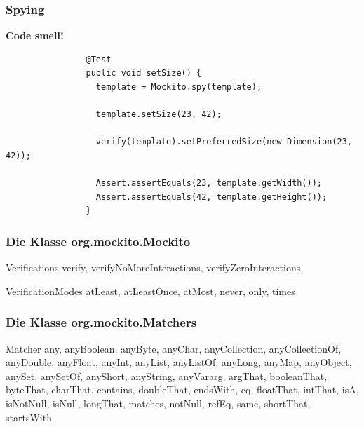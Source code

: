 \documentclass{beamer}
\begin{document}
			\begin{frame}[fragile]
				\frametitle{Spying}
				\color{red}\textbf{Code smell!}
				\color{black}
				\begin{lstlisting}
				@Test
				public void setSize() {
				  template = Mockito.spy(template);

				  template.setSize(23, 42);

				  verify(template).setPreferredSize(new Dimension(23, 42));

				  Assert.assertEquals(23, template.getWidth());
				  Assert.assertEquals(42, template.getHeight());
				}
				\end{lstlisting}
			\end{frame}

			\begin{frame}
				\frametitle{Die Klasse org.mockito.Mockito}

				\begin{block}{Verifications}
				verify, verifyNoMoreInteractions, verifyZeroInteractions
				\end{block}

				\begin{block}{VerificationModes}
				atLeast, atLeastOnce, atMost, never, only, times
				\end{block}
			\end{frame}

			\begin{frame}
				\frametitle{Die Klasse org.mockito.Matchers}

				\begin{block}{Matcher}
				any, anyBoolean, anyByte, anyChar, anyCollection, anyCollectionOf, anyDouble, anyFloat, anyInt, anyList, anyListOf, anyLong, anyMap, anyObject, anySet, anySetOf, anyShort, anyString, anyVararg, argThat, booleanThat, byteThat, charThat, contains, doubleThat, endsWith, eq, floatThat, intThat, isA, isNotNull, isNull, longThat, matches, notNull, refEq, same, shortThat, startsWith
				\end{block}
			\end{frame}

	
\end{document}
